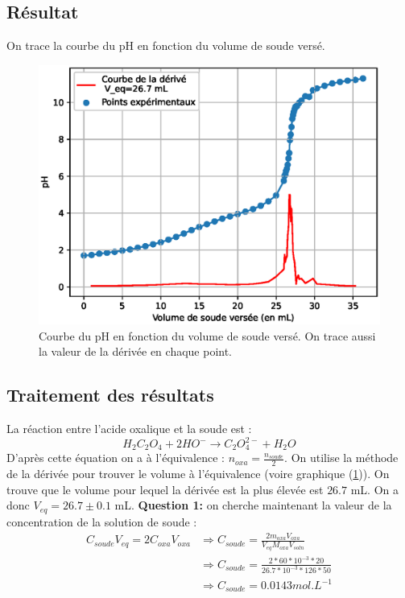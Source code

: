 \documentclass[12pt]{article}
\begin{document}
\newpage	
	\subsection{Résultat}
On trace la courbe du pH en fonction du volume de soude versé.
\begin{figure}[h!]
	\begin{center}
		\includegraphics[scale=0.7]{Titrage_1.eps}
		\caption{Courbe du pH en fonction du volume de soude versé. On trace aussi la valeur de la dérivée en chaque point.}
		\label{Titrage_soude}
	\end{center}
\end{figure}	
	
	\subsection{Traitement des résultats}
	
La réaction entre l'acide oxalique et la soude est :
\begin{equation}
H_2C_2O_4+ 2 HO^- \longrightarrow C_2O_4^{2-} + H_2O
\end{equation}
D'après cette équation on a à l'équivalence : $n_{oxa}=\frac{n_{soude}}{2}$. On utilise la méthode de la dérivée pour trouver le volume à l'équivalence (voire graphique (\ref{Titrage_soude})). On trouve que le volume pour lequel la dérivée est la plus élevée est $26.7$ mL. On a donc $V_{eq}=26.7\pm 0.1 $ mL. \textbf{Question 1:} on cherche maintenant la valeur de la concentration de la solution de soude :
	\begin{align*}
C_{soude}V_{eq}=2C_{oxa}V_{oxa}& \Longrightarrow C_{soude} = \frac{2 m_{oxa} V_{oxa}}{V_{eq} M_{oxa} V_{soln}} \\
& \Longrightarrow C_{soude} = \frac{2*60*10^{-3}*20}{26.7*10^{-3}*126*50}\\ & \Longrightarrow C_{soude} =  0.0143 mol.L^{-1}		
	\end{align*}
	
\end{document}
